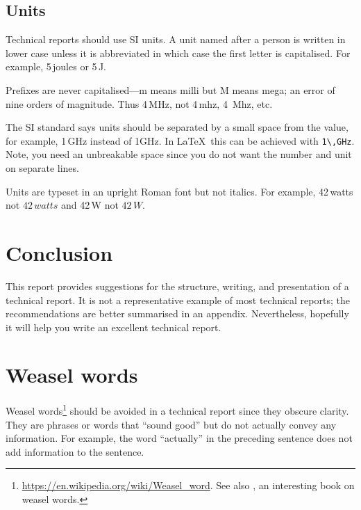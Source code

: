 \documentclass[a4paper,12pt]{article}
\newcounter{foo}
\begin{document}
\subsection{Units}
\label{sec:units}

\begin{list}{U-}{}
\item Technical reports should use SI units.  A unit named after a person is
written in lower case unless it is abbreviated in which case the first
letter is capitalised.    For example, 5\,joules or 5\,J.

\item Prefixes are never capitalised---m means milli but M means mega;
  an error of nine orders of magnitude.  Thus 4\,MHz, not 4\,mhz,
  4~Mhz, etc.

\item The SI standard says units should be separated by a small space
  from the value, for example, 1\,GHz instead of 1GHz.  In
  \LaTeX\ this can be achieved with \verb+1\,GHz+.  Note, you need an
  unbreakable space since you do not want the number and unit on
  separate lines.

\item Units are typeset in an upright Roman font but not italics.  For
  example, 42\,watts not $42\,watts$ and 42\,W not $42\,W$.

\end{list}


\section{Conclusion}
\label{sec:conclusion}

This report provides suggestions for the structure, writing, and
presentation of a technical report.  It is not a representative
example of most technical reports; the recommendations are better
summarised in an appendix.  Nevertheless, hopefully it will help you
write an excellent technical report.






\appendix


\section{Weasel words}
\label{sec:weasel_words}

Weasel words\footnote{\url{https://en.wikipedia.org/wiki/Weasel_word}.
See also \citet{Howard_1983}, an interesting book on weasel words.}
should be avoided in a technical report since they obscure clarity.
They are phrases or words that ``sound good'' but do not actually
convey any information.  For example, the word ``actually'' in the
preceding sentence does not add information to the sentence.
\end{document}
